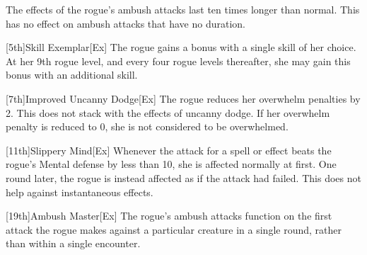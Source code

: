         The effects of the rogue's ambush attacks last ten times longer than normal.
        This has no effect on ambush attacks that have no duration.

        [5th]{Skill Exemplar}[Ex]
        The rogue gains a  bonus with a single skill of her choice.
        At her 9th rogue level, and every four rogue levels thereafter, she may gain this bonus with an additional skill.

        [7th]{Improved Uncanny Dodge}[Ex]
        The rogue reduces her overwhelm penalties by 2.
        This does not stack with the effects of uncanny dodge.
        If her overwhelm penalty is reduced to 0, she is not considered to be overwhelmed.

        [11th]{Slippery Mind}[Ex]
        Whenever the attack for a  spell or effect beats the rogue's Mental defense by less than 10, she is affected normally at first.
        One round later, the rogue is instead affected as if the attack had failed.
        This does not help against instantaneous effects.

        [19th]{Ambush Master}[Ex]
        The rogue's ambush attacks function on the first attack the rogue makes against a particular creature in a single round, rather than within a single encounter.

